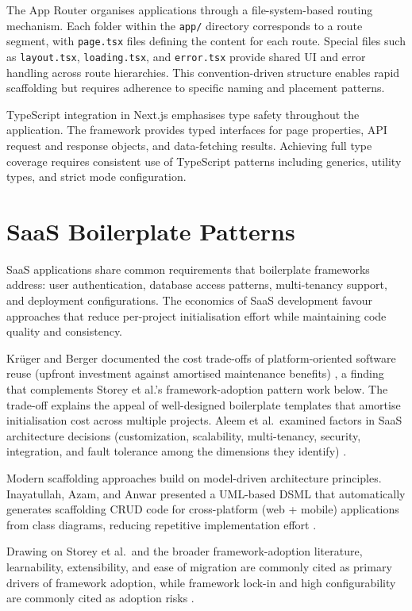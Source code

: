 \documentclass[12pt,a4paper]{report}
\DeclareRobustCommand{\filename}[1]{\bgroup\urlstyle{tt}\nolinkurl{#1}\egroup}
\begin{document}
The App Router organises applications through a file-system-based routing mechanism. Each folder within the \filename{app/} directory corresponds to a route segment, with \filename{page.tsx} files defining the content for each route. Special files such as \filename{layout.tsx}, \filename{loading.tsx}, and \filename{error.tsx} provide shared UI and error handling across route hierarchies. This convention-driven structure enables rapid scaffolding but requires adherence to specific naming and placement patterns.

TypeScript integration in Next.js emphasises type safety throughout the application. The framework provides typed interfaces for page properties, API request and response objects, and data-fetching results. Achieving full type coverage requires consistent use of TypeScript patterns including generics, utility types, and strict mode configuration.

\section{SaaS Boilerplate Patterns}

SaaS applications share common requirements that boilerplate frameworks address: user authentication, database access patterns, multi-tenancy support, and deployment configurations. The economics of SaaS development favour approaches that reduce per-project initialisation effort while maintaining code quality and consistency.

Krüger and Berger documented the cost trade-offs of platform-oriented software reuse (upfront investment against amortised maintenance benefits) \parencite{kruger2020empirical}, a finding that complements Storey et al.'s framework-adoption pattern work below. The trade-off explains the appeal of well-designed boilerplate templates that amortise initialisation cost across multiple projects. Aleem et al.\ examined factors in {SaaS} architecture decisions (customization, scalability, multi-tenancy, security, integration, and fault tolerance among the dimensions they identify) \parencite{aleem2019maturity}.

Modern scaffolding approaches build on model-driven architecture principles. Inayatullah, Azam, and Anwar presented a UML-based DSML that automatically generates scaffolding CRUD code for cross-platform (web + mobile) applications from class diagrams, reducing repetitive implementation effort \parencite{inayatullah2019model}.

Drawing on Storey et al.\ and the broader framework-adoption literature, learnability, extensibility, and ease of migration are commonly cited as primary drivers of framework adoption, while framework lock-in and high configurability are commonly cited as adoption risks \parencite{storey2016frameworkadoption}.
\end{document}
